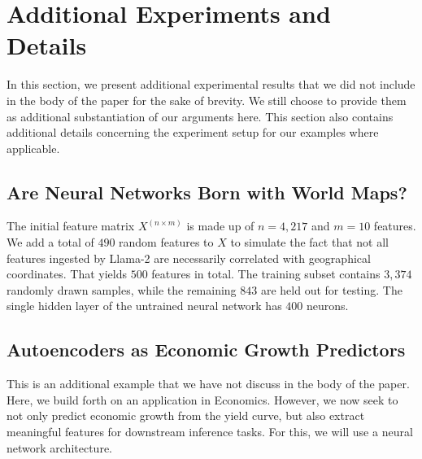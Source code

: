 \twocolumn

\section{Additional Experiments and Details}\label{appendix:autoencoder}

In this section, we present additional experimental results that we did not include in the body of the paper for the sake of brevity. We still choose to provide them as additional substantiation of our arguments here. This section also contains additional details concerning the experiment setup for our examples where applicable. 

\subsection{Are Neural Networks Born with World Maps?}

The initial feature matrix \(X^{(n \times m)}\) is made up of \(n=4,217\) and \(m=10\) features.  We add a total of \(490\) random features to \(X\) to simulate the fact that not all features ingested by Llama-2 are necessarily correlated with geographical coordinates. That yields \(500\) features in total. The training subset contains \(3,374\) randomly drawn samples, while the remaining \(843\) are held out for testing. The single hidden layer of the untrained neural network has \(400\) neurons.

\subsection{Autoencoders as Economic Growth Predictors}\label{example-deep-learning}


This is an additional example that we have not discuss in the body of the paper. Here, we build forth on an application in Economics. However, we now seek to not only predict economic growth from the yield curve, but also extract meaningful features for downstream inference tasks. For this, we will use a neural network architecture.

